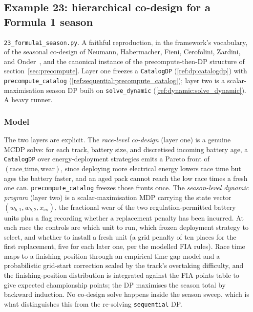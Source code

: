 \documentclass[11pt,a4paper]{article}
\begin{document}
\subsection{Example 23: hierarchical co-design for a Formula 1 season}
\label{ex:23}

\texttt{23\_formula1\_season.py}. A faithful reproduction, in the
framework's vocabulary, of the seasonal co-design of Neumann,
Habermacher, Fieni, Cerofolini, Zardini, and
Onder~\citep{neumann2025formula1}, and the
canonical instance of the precompute-then-DP structure of
section~\ref{sec:precompute}. Layer one freezes a \texttt{CatalogDP}
(\ref{ref:dp:catalogdp}) with \texttt{precompute\_catalog}
(\ref{ref:sequential:precompute_catalog}); layer two is a
scalar-maximisation season DP built on \texttt{solve\_dynamic}
(\ref{ref:dynamic:solve_dynamic}). A heavy runner.

\subsubsection*{Model}
The two layers are explicit. The \emph{race-level co-design} (layer one)
is a genuine MCDP solve: for each track, battery size, and discretised
incoming battery age, a \texttt{CatalogDP} over energy-deployment
strategies emits a Pareto front of $(\text{race\_time},\text{wear})$,
since deploying more electrical energy lowers race time but ages the
battery faster, and an aged pack cannot reach the low race times a fresh
one can. \texttt{precompute\_catalog} freezes those fronts once. The
\emph{season-level dynamic program} (layer two) is a scalar-maximisation
MDP carrying the state vector $(w_{b,1}, w_{b,2}, x_{\mathrm{ex}})$, the
fractional wear of the two regulation-permitted battery units plus a flag
recording whether a replacement penalty has been incurred. At each race
the controls are which unit to run, which frozen deployment strategy to
select, and whether to install a fresh unit (a grid penalty of ten places
for the first replacement, five for each later one, per the modelled FIA
rules). Race time maps to a finishing position through an empirical
time-gap model and a probabilistic grid-start correction scaled by the
track's overtaking difficulty, and the finishing-position distribution is
integrated against the FIA points table to give expected championship
points; the DP maximises the season total by backward induction. No
co-design solve happens inside the season sweep, which is what
distinguishes this from the re-solving \texttt{sequential} DP.
\end{document}
